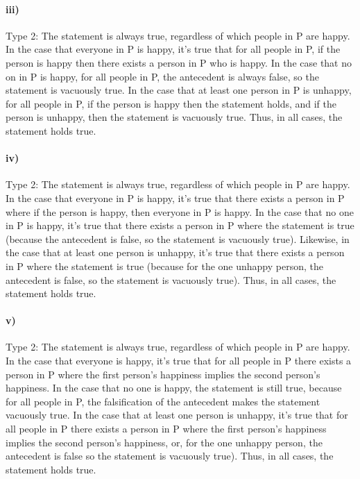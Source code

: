 \documentclass[10pt,letter]{article}
\begin{document}
\paragraph{iii)} Type 2: The statement is always true, regardless of which people in P are happy. In the case that everyone in P is happy, it's true that for all people in P, if the person is happy then there exists a person in P who is happy. In the case that no on in P is happy, for all people in P, the antecedent is always false, so the statement is vacuously true. In the case that at least one person in P is unhappy, for all people in P, if the person is happy then the statement holds, and if the person is unhappy, then the statement is vacuously true. Thus, in all cases, the statement holds true.

\paragraph{iv)} Type 2: The statement is always true, regardless of which people in P are happy. In the case that everyone in P is happy, it's true that there exists a person in P where if the person is happy, then everyone in P is happy. In the case that no one in P is happy, it's true that there exists a person in P where the statement is true (because the antecedent is false, so the statement is vacuously true). Likewise, in the case that at least one person is unhappy, it's true that there exists a person in P where the statement is true (because for the one unhappy person, the antecedent is false, so the statement is vacuously true). Thus, in all cases, the statement holds true.

\paragraph{v)} Type 2: The statement is always true, regardless of which people in P are happy. In the case that everyone is happy, it's true that for all people in P there exists a person in P where the first person's happiness implies the second person's happiness. In the case that no one is happy, the statement is still true, because for all people in P, the falsification of the antecedent makes the statement vacuously true. In the case that at least one person is unhappy, it's true that for all people in P there exists a person in P where the first person's happiness implies the second person's happiness, or, for the one unhappy person, the antecedent is false so the statement is vacuously true). Thus, in all cases, the statement holds true.
\end{document}

